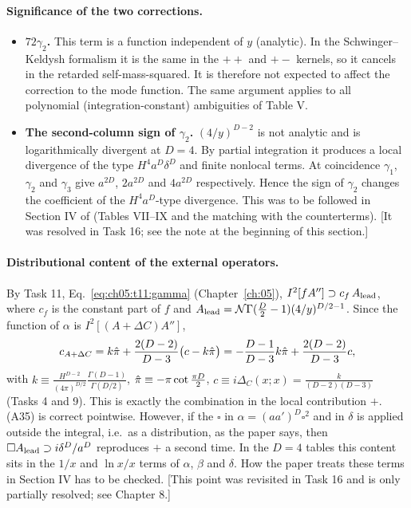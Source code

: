 \paragraph{Significance of the two corrections.}
\begin{itemize}[leftmargin=14pt]
\item \textbf{$72\gamma_2$.} This term is a function independent of $y$ (analytic). In the Schwinger--Keldysh formalism it is the same in the
$++$ and $+-$ kernels, so it cancels in the retarded self-mass-squared. It is therefore not expected to affect the correction to the mode function.
The same argument applies to all polynomial (integration-constant) ambiguities of Table V.
\item \textbf{The second-column sign of $\gamma_2$.} $(4/y)^{D-2}$ is not analytic and is logarithmically divergent at $D=4$. By partial integration
it produces a local divergence of the type $H^4a^D\delta^D$ and finite nonlocal terms. At coincidence $\gamma_1$, $\gamma_2$ and $\gamma_3$ give
$a^{2D}$, $2a^{2D}$ and $4a^{2D}$ respectively. Hence the sign of $\gamma_2$ changes the coefficient of the $H^4a^D$-type divergence. This was to be
followed in Section IV of \PI{} (Tables VII--IX and the matching with the counterterms). [It was resolved in Task 16; see the note at the
beginning of this section.]
\end{itemize}

\paragraph{Distributional content of the external operators.} By Task 11, Eq.~\eqref{eq:ch05:t11:gamma} (Chapter~\ref{ch:05}), $I^2[fA'']\supset c_f\,A_{\rm lead}$, where
$c_f$ is the constant part of $f$ and $A_{\rm lead}=\mathcal N\Gamma(\frac D2-1)(4/y)^{D/2-1}$. Since the function of $\alpha$ is $I^2[(A+\Delta C)A'']$,
\begin{equation}
c_{A+\Delta C}=k\hat\pi+\frac{2(D-2)}{D-3}\big(c-k\hat\pi\big)=-\frac{D-1}{D-3}k\hat\pi+\frac{2(D-2)}{D-3}c ,
\end{equation}
with $k\equiv\frac{H^{D-2}}{(4\pi)^{D/2}}\frac{\Gamma(D-1)}{\Gamma(D/2)}$, $\hat\pi\equiv-\pi\cot\frac{\pi D}{2}$, $c\equiv i\Delta_C(x;x)=\frac{k}{(D-2)(D-3)}$
(Tasks 4 and 9). This is exactly the combination in the local contribution $+$. (A35) is correct pointwise. However, if the
$\square$ in $\alpha=(aa')^D\square^2$ and in $\delta$ is applied outside the integral, i.e.\ as a distribution, as the paper says, then
$\square A_{\rm lead}\supset i\delta^D/a^D$ reproduces $+$ a second time. In the $D=4$ tables this content sits in the $1/x$ and
$\ln x/x$ terms of $\alpha$, $\beta$ and $\delta$. How the paper treats these terms in Section IV has to be checked. [This point was revisited in
Task 16 and is only partially resolved; see Chapter 8.]

